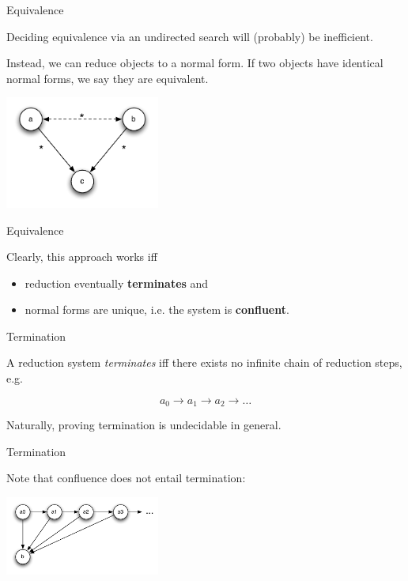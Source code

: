 \documentclass{beamer}
\begin{document}
\begin{frame}{Equivalence}

Deciding equivalence via an undirected search will (probably) be inefficient.

Instead, we can reduce objects to a normal form. If two objects have identical
normal forms, we say they are equivalent.

\begin{center}
\includegraphics[width=2in]{images/church-rosser}
\end{center}

\end{frame}


\begin{frame}{Equivalence}

Clearly, this approach works iff

\begin{itemize}
  \item reduction eventually \textbf{terminates} and
  \item normal forms are unique, i.e. the system is \textbf{confluent}.
\end{itemize}

\end{frame}


\begin{frame}{Termination}

A reduction system \emph{terminates} iff there exists no infinite chain of
reduction steps, e.g.

\[
a_0 \to a_1 \to a_2 \to \ldots
\]

Naturally, proving termination is undecidable in general.

\end{frame}


\begin{frame}{Termination}

Note that confluence does not entail termination:

\begin{center}
\includegraphics[width=2in]{images/ars}
\end{center}

\end{frame}
\end{document}
